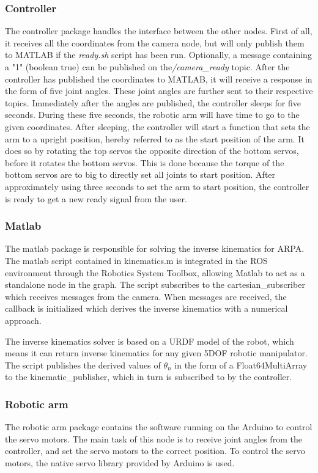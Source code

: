 \documentclass[11pt,a4paper, titlepage]{article}
\begin{document}
\subsubsection{Controller}
The controller package handles the interface between the other nodes. First of all, it receives all the coordinates from the camera node, but will only publish them to MATLAB if the \textit{ready.sh} script has been run. Optionally, a message containing a  "1" (boolean true) can be published on the\textit{/camera\_ready} topic. After the controller has published the coordinates to MATLAB, it will receive a response in the form of five joint angles. These joint angles are further sent to their respective topics. Immediately after the angles are published, the controller sleeps for five seconds. During these five seconds, the robotic arm will have time to go to the given coordinates. After sleeping, the controller will start a function that sets the arm to a upright position, hereby referred to as the start position of the arm. It does so by rotating the top servos the opposite direction of the bottom servos, before it rotates the bottom servos. This is done because the torque of the bottom servos are to big to directly set all joints to start position. After approximately using three seconds to set the arm to start position, the controller is ready to get a new ready signal from the user.

\subsubsection{Matlab}
The matlab package is responsible for solving the inverse kinematics for ARPA. The matlab script contained in kinematics.m is integrated in the ROS environment through the Robotics System Toolbox, allowing Matlab to act as a standalone node in the graph. The script subscribes to the cartesian\_subscriber which receives messages from the camera. When messages are received, the callback is initialized which derives the inverse kinematics with a numerical approach.

The inverse kinematics solver is based on a URDF model of the robot, which means it can return inverse kinematics for any given 5DOF robotic manipulator. The script publishes the derived values of $\theta_n$ in the form of a Float64MultiArray to the kinematic\_publisher, which in turn is subscribed to by the controller.

\subsubsection{Robotic arm}
The robotic arm package contains the software running on the Arduino to control the servo motors. The main task of this node is to receive joint angles from the controller, and set the servo motors to the correct position. To control the servo motors, the native servo library provided by Arduino is used.
\end{document}
